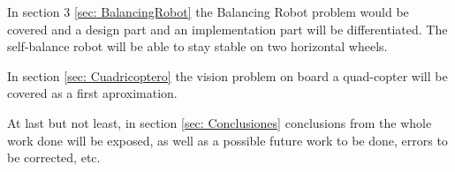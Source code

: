 In section 3 \ref{sec: BalancingRobot} the Balancing Robot problem would be covered and a design part and an implementation part will be differentiated. The self-balance robot will be able to stay stable on two horizontal wheels.\newline

In section \ref{sec: Cuadricoptero} the vision problem on board a quad-copter will be covered as a first aproximation. \newline

At last but not least, in section \ref{sec: Conclusiones} conclusions from the whole work done will be exposed, as well as a possible future work to be done, errors to be corrected, etc.